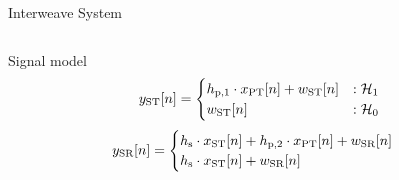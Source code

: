 \documentclass[16pt]{beamer}
\begin{document}
\begin{frame}[t]{Interweave System}
\begin{columns}
\begin{column}{0.44\columnwidth}
			\onslide<2->
			{
				\begin{block}{\scriptsize Signal model} %
				\begin{equation*}
					y_{\text{ST}}[n] = 
					\begin{cases}
					h_{\text{p,1}} \cdot x_{\text{PT}}[n] + w_{\text{ST}}[n] & : \mathcal{H}_1 \\
					w_{\text{ST}}[n] & :\mathcal{H}_0
					\end{cases}
				\end{equation*}
				\begin{equation*}
					\ys[n] = 
					\begin{cases}
						\hs \cdot \xs[n] + \hpt \cdot \xp[n] +  \wsr[n] & \\%
						\hs \cdot \xs[n] + \wsr[n] & %
					\end{cases}
					\label{eq_IS:sys_mod_ss}
				\end{equation*}
				\end{block}
			}
			{
			
}
\end{column}
\end{columns}
\end{frame}
\end{document}
